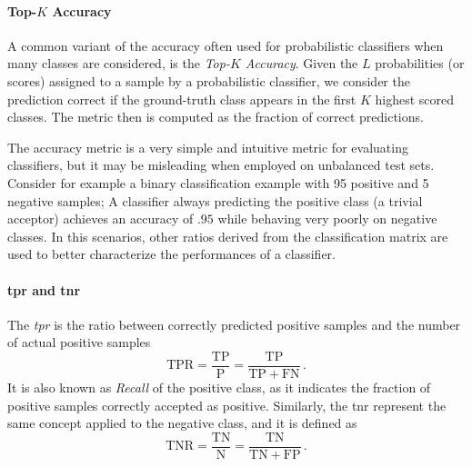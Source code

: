 \paragraph{Top-$K$ Accuracy}
A common variant of the accuracy often used for probabilistic classifiers when many classes are considered, is the \emph{Top-$K$ Accuracy}.
Given the $L$ probabilities (or scores) assigned to a sample by a probabilistic classifier, we consider the prediction correct if the ground-truth class appears in the first $K$ highest scored classes.
The metric then is computed as the fraction of correct predictions.

The accuracy metric is a very simple and intuitive metric for evaluating classifiers, but it may be misleading when employed on unbalanced test sets.
Consider for example a binary classification example with 95 positive and 5 negative samples;
A classifier always predicting the positive class (a trivial acceptor) achieves an accuracy of $.95$ while behaving very poorly on negative classes.
In this scenarios, other ratios derived from the classification matrix are used to better characterize the performances of a classifier.

\paragraph{\acrshort{tpr} and \acrshort{tnr}}
The \emph{\gls{tpr}} is the ratio between correctly predicted positive samples and the number of actual positive samples
\begin{equation} \label{eq:back:tpr}
    \mathrm{TPR} = \frac{\mathrm{TP}}{\mathrm{P}} = \frac{\mathrm{TP}}{\mathrm{TP} + \mathrm{FN}} \,.
\end{equation}
It is also known as \emph{Recall} of the positive class, as it indicates the fraction of positive samples correctly accepted as positive.
Similarly, the \gls{tnr} represent the same concept applied to the negative class, and it is defined as
\begin{equation} \label{eq:back:tnr}
    \mathrm{TNR} = \frac{\mathrm{TN}}{\mathrm{N}} = \frac{\mathrm{TN}}{\mathrm{TN} + \mathrm{FP}} \,.
\end{equation}

